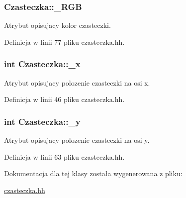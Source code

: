 \subsubsection[{\+\_\+\+R\+G\+B}]{ Czasteczka\+::\+\_\+\+R\+G\+B}\label{class_czasteczka_ab9c93cfb3cf0360579ad0def2a94178c}
Atrybut opisujacy kolor czasteczki. 

Definicja w linii 77 pliku czasteczka.\+hh.

\hypertarget{class_czasteczka_af809cd4fb1651ebf4b5980ee38c68e58}{}
\subsubsection[{\+\_\+x}]{\setlength{\rightskip}{0pt plus 5cm}int Czasteczka\+::\+\_\+x}\label{class_czasteczka_af809cd4fb1651ebf4b5980ee38c68e58}
Atrybut opisujacy polozenie czasteczki na osi x. 

Definicja w linii 46 pliku czasteczka.\+hh.

\hypertarget{class_czasteczka_a285d25465eee101b6af073809e2fee00}{}
\subsubsection[{\+\_\+y}]{\setlength{\rightskip}{0pt plus 5cm}int Czasteczka\+::\+\_\+y}\label{class_czasteczka_a285d25465eee101b6af073809e2fee00}
Atrybut opisujacy polozenie czasteczki na osi y. 

Definicja w linii 63 pliku czasteczka.\+hh.



Dokumentacja dla tej klasy została wygenerowana z pliku\+:\begin{DoxyCompactItemize}
\item 
\hyperlink{czasteczka_8hh}{czasteczka.\+hh}\end{DoxyCompactItemize}
